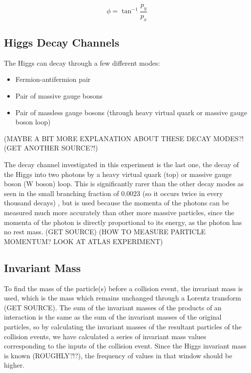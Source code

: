 \documentclass[11pt]{amsart}
\begin{document}
\begin{multicols}{2}
\begin{equation}
  \label{eq:azimuthal}
  \phi = \tan^{-1} \frac{p_y}{p_x}
\end{equation}

\subsection{Higgs Decay Channels}

The Higgs can decay through a few different modes:

\begin{itemize}
    \item Fermion-antifermion pair
    \item Pair of massive gauge bosons
    \item Pair of massless gauge bosons (through heavy virtual quark or massive gauge boson loop)
\end{itemize}

\cite{decaymodes1} \cite{decaymodes2}

(MAYBE A BIT MORE EXPLANATION ABOUT THESE DECAY MODES?! (GET ANOTHER SOURCE?!)

The decay channel investigated in this experiment is the last one, the decay of the Higgs into two photons by a heavy virtual quark (top) or massive gauge boson (W boson) loop. This is significantly rarer than the other decay modes as seen in the small branching fraction of $0.0023$ (so it occurs twice in every thousand decays) \cite{HiggsCross1}, but is used because the momenta of the photons can be measured much more accurately than other more massive particles, since the momenta of the photon is directly proportional to its energy, as the photon has no rest mass. (GET SOURCE) (HOW TO MEASURE PARTICLE MOMENTUM? LOOK AT ATLAS EXPERIMENT)

\subsection{Invariant Mass}
\label{sec:invariant}

To find the mass of the particle(s) before a collision event, the invariant mass is used, which is the mass which remains unchanged through a Lorentz transform (GET SOURCE). The sum of the invariant masses of the products of an interaction is the same as the sum of the invariant masses of the original particles, so by calculating the invariant masses of the resultant particles of the collision events, we have calculated a series of invariant mass values corresponding to the inputs of the collision event. Since the Higgs invariant mass is known (ROUGHLY?!?), the frequency of values in that window should be higher.


\end{multicols}
\end{document}
